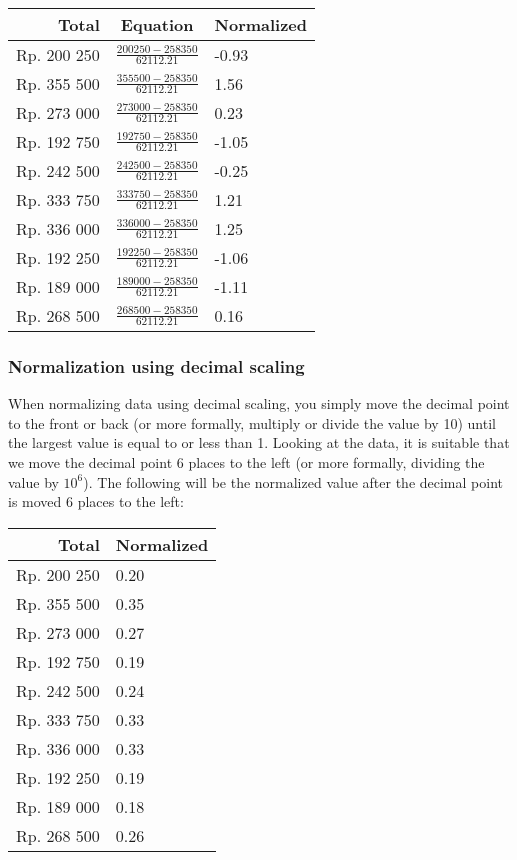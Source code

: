 \documentclass[
  11pt, %
]{assignment}
\begin{document}
\begin{center}
	\begin{tabular}{r | c | l}
		Total       & Equation                             & Normalized \\
		\toprule
		Rp. 200 250 & \(\frac{200250 - 258350}{62112.21}\) & -0.93      \\[4pt]
		Rp. 355 500 & \(\frac{355500 - 258350}{62112.21}\) & 1.56       \\[4pt]
		Rp. 273 000 & \(\frac{273000 - 258350}{62112.21}\) & 0.23       \\[4pt]
		Rp. 192 750 & \(\frac{192750 - 258350}{62112.21}\) & -1.05      \\[4pt]
		Rp. 242 500 & \(\frac{242500 - 258350}{62112.21}\) & -0.25      \\[4pt]
		Rp. 333 750 & \(\frac{333750 - 258350}{62112.21}\) & 1.21       \\[4pt]
		Rp. 336 000 & \(\frac{336000 - 258350}{62112.21}\) & 1.25       \\[4pt]
		Rp. 192 250 & \(\frac{192250 - 258350}{62112.21}\) & -1.06      \\[4pt]
		Rp. 189 000 & \(\frac{189000 - 258350}{62112.21}\) & -1.11      \\[4pt]
		Rp. 268 500 & \(\frac{268500 - 258350}{62112.21}\) & 0.16       \\
		\bottomrule
	\end{tabular}
\end{center}

\subsubsection*{Normalization using decimal scaling}

When normalizing data using decimal scaling, you simply move the decimal point to the front or back (or more formally, multiply or divide the value by 10) until the largest value is equal to or less than 1. Looking at the data, it is suitable that we move the decimal point 6 places to the left (or more formally, dividing the value by \(10^6\)). The following will be the normalized value after the decimal point is moved 6 places to the left:

\begin{center}
	\begin{tabular}{r  l}
		Total       & Normalized \\
		\toprule
		Rp. 200 250 & 0.20       \\
		Rp. 355 500 & 0.35       \\
		Rp. 273 000 & 0.27       \\
		Rp. 192 750 & 0.19       \\
		Rp. 242 500 & 0.24       \\
		Rp. 333 750 & 0.33       \\
		Rp. 336 000 & 0.33       \\
		Rp. 192 250 & 0.19       \\
		Rp. 189 000 & 0.18       \\
		Rp. 268 500 & 0.26       \\
		\bottomrule
	\end{tabular}
\end{center}
\end{document}
